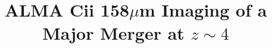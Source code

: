 \documentclass[twocolumn]{aastex62}
\begin{document}

\title{ALMA C{\sc ii} 158$\mu$m Imaging of a Major Merger at $z \sim 4$}


\end{document}
